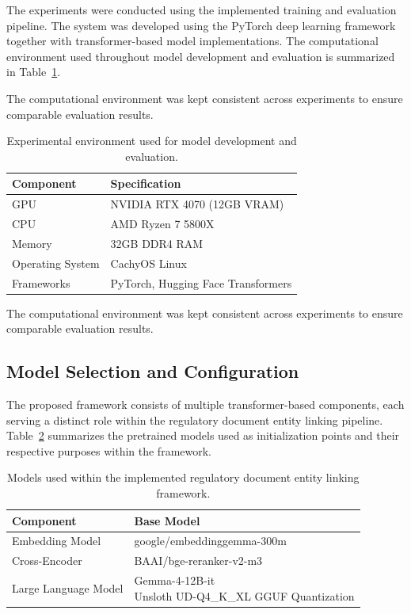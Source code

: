 The experiments were conducted using the implemented training and evaluation pipeline. The system was developed using the PyTorch deep learning framework together with transformer-based model implementations. The computational environment used throughout model development and evaluation is summarized in Table~\ref{tab:experimental_environment}.

The computational environment was kept consistent across experiments to ensure comparable evaluation results.

\begin{table}[ht]
\centering
\caption{Experimental environment used for model development and evaluation.}
\label{tab:experimental_environment}
\begin{tabular}{ll}
\hline
\textbf{Component} & \textbf{Specification} \\
\hline
GPU & NVIDIA RTX 4070 (12GB VRAM) \\
CPU & AMD Ryzen 7 5800X \\
Memory & 32GB DDR4 RAM \\
Operating System & CachyOS Linux \\
Frameworks & PyTorch, Hugging Face Transformers \\
\hline
\end{tabular}
\end{table}

The computational environment was kept consistent across experiments to ensure comparable evaluation results.

\subsection{Model Selection and Configuration}

The proposed framework consists of multiple transformer-based components, each serving a distinct role within the regulatory document entity linking pipeline. Table~\ref{tab:model_configuration} summarizes the pretrained models used as initialization points and their respective purposes within the framework.

\begin{table}[H]
\centering
\caption{Models used within the implemented regulatory document entity linking framework.}
\label{tab:model_configuration}
\begin{tabular}{ll}
\hline
\textbf{Component} & \textbf{Base Model} \\
\hline

Embedding Model &
google/embeddinggemma-300m \cite{embeddinggemma2025}
\\[0.2cm]

Cross-Encoder &
BAAI/bge-reranker-v2-m3 \cite{chen2024bge}
\\[0.2cm]

Large Language Model &
\makecell[l]{Gemma-4-12B-it \cite{gemma4technicalreport2026}\\
Unsloth UD-Q4\_K\_XL GGUF Quantization \cite{unslothgemma4gguf2026}}
\\

\hline
\end{tabular}
\end{table}


